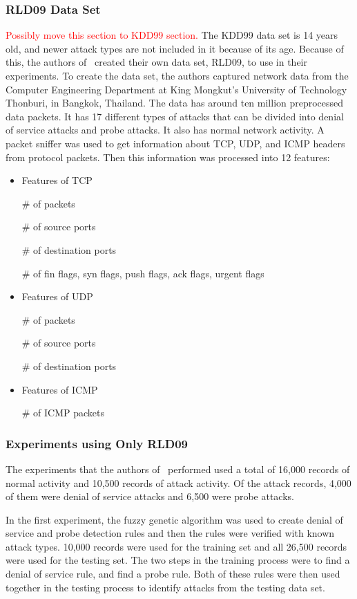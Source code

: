 \documentclass{sig-alternate}
\newcommand{\mycomment}[1]{\textcolor{red}{#1}}
\begin{document}
\subsubsection{RLD09 Data Set}
\mycomment{Possibly move this section to KDD99 section.}
The KDD99 data set is 14 years old, and newer attack types are not included in it because of its age. Because of this, the authors of~\cite{6496342, 6559603} created their own data set, RLD09, to use in their experiments. To create the data set, the authors captured network data from the Computer Engineering Department at King Mongkut's University of Technology Thonburi, in Bangkok, Thailand. The data has around ten million preprocessed data packets. It has 17 different types of attacks that can be divided into denial of service attacks and probe attacks. It also has normal network activity. A packet sniffer was used to get information about TCP, UDP, and ICMP headers from protocol packets. Then this information was processed into 12 features:
\begin{itemize}
  \item Features of TCP

    \# of packets

    \# of source ports

    \# of destination ports

    \# of fin flags, syn flags, push flags, ack flags, urgent flags
  \item Features of UDP

    \# of packets

    \# of source ports

    \# of destination ports
  \item Features of ICMP

    \# of ICMP packets
\end{itemize}




\subsubsection{Experiments using Only RLD09}
The experiments that the authors of~\cite{6496342, 6559603} performed used a total of 16,000 records of normal activity and 10,500 records of attack activity. Of the attack records, 4,000 of them were denial of service attacks and 6,500 were probe attacks.

In the first experiment, the fuzzy genetic algorithm was used to create denial of service and probe detection rules and then the rules were verified with known attack types. 10,000 records were used for the training set and all 26,500 records were used for the testing set. The two steps in the training process were to find a denial of service rule, and find a probe rule. Both of these rules were then used together in the testing process to identify attacks from the testing data set.
\end{document}
